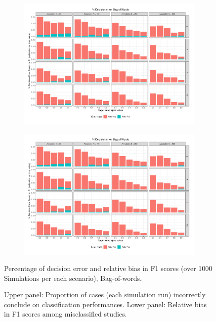 \documentclass[man, 12pt, a4paper, nolmodern, noextraspace]{apa6}
\begin{document}
\begin{figure}
    \centering
    \begin{subfigure}[t]{0.95\textwidth}
        \centering
        \includegraphics[clip, width=\linewidth, page = 1]{Results/BoW_summary_05.pdf} 
    \end{subfigure}
    \begin{subfigure}[t]{0.95\textwidth}
        \centering
        \includegraphics[clip, width=\linewidth, page = 2]{Results/BoW_summary_05.pdf} 
    \end{subfigure}
    
    \captionsetup{format=hang}
    \caption{Percentage of decision error and relative bias in F1 scores (over 1000 Simulations per each scenario), Bag-of-words.} 
    \label{fig:Figure4}
    \captionsetup{font=small}
    \caption*{Upper panel: Proportion of cases (each simulation run) incorrectly conclude on classification performances. Lower panel: Relative bias in F1 scores among misclassified studies.}
\end{figure}     
\end{document}
